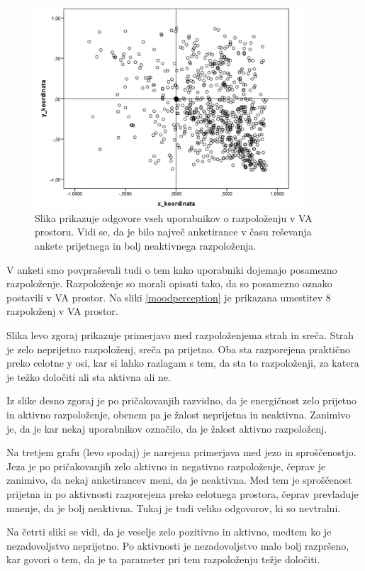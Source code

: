 \documentclass[a4paper, 12pt]{book}
\begin{document}
{\begin{figure}[hbt]
\centering
\includegraphics[width=10cm]{images/vamood.png}

\caption{Slika prikazuje odgovore vseh uporabnikov o razpoloženju v VA prostoru. Vidi se, da je bilo največ anketirance v času reševanja ankete prijetnega in bolj neaktivnega razpoloženja.  }
\label{razpolozenjeva}
\end{figure}

V anketi smo povpraševali tudi o tem kako uporabniki dojemajo posamezno razpoloženje. Razpoloženje so morali opisati tako, da so posamezno oznako postavili v VA prostor. Na sliki \ref{moodperception} je prikazana umestitev 8 razpoloženj v VA prostor. 

Slika levo zgoraj prikazuje primerjavo med razpoloženjema strah in sreča. Strah je zelo neprijetno razpoloženj, sreča pa prijetno. Oba sta razporejena praktično preko celotne y osi, kar si lahko razlagam s tem, da sta to razpoloženji, za katera je težko določiti ali sta aktivna ali ne. 

Iz slike desno zgoraj je po pričakovanjih razvidno, da je energičnost zelo prijetno in aktivno razpoloženje, obenem pa je žalost neprijetna in neaktivna. Zanimivo je, da je kar nekaj uporabnikov označilo, da je žalost aktivno razpoloženj.

Na tretjem grafu (levo spodaj) je narejena primerjava med jezo in sproščenostjo. Jeza je po pričakovanjih zelo aktivno in negativno razpoloženje, čeprav je zanimivo, da nekaj anketirancev meni, da je neaktivna. Med tem je sproščenost prijetna in po aktivnosti razporejena preko celotnega prostora, čeprav prevladuje mnenje, da je bolj neaktivna. Tukaj je tudi veliko odgovorov, ki so nevtralni.

Na četrti sliki se vidi, da je veselje zelo pozitivno in aktivno, medtem ko je nezadovoljstvo neprijetno. Po aktivnosti je nezadovoljstvo malo bolj razpršeno, kar govori o tem, da je ta parameter pri tem razpoloženju težje določiti.

}
\end{document}
